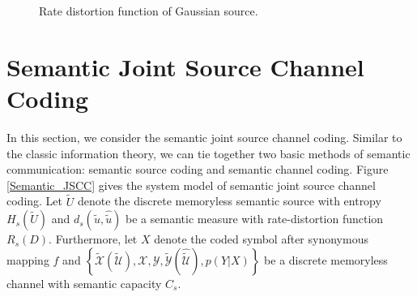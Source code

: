\documentclass[12pt, draftclsnofoot,onecolumn]{IEEEtran}
\begin{document}
\begin{figure}[htbp]
\setlength{\abovecaptionskip}{0.cm}
\setlength{\belowcaptionskip}{-0.cm}
  \caption{Rate distortion function of Gaussian source.}\label{rate_distortion_comp}
\end{figure}

\section{Semantic Joint Source Channel Coding}
\label{section_X}
In this section, we consider the semantic joint source channel coding. Similar to the classic information theory, we can tie together two basic methods of semantic communication: semantic source coding and semantic channel coding. Figure \ref{Semantic_JSCC} gives the system model of semantic joint source channel coding. Let $\tilde{U}$ denote the discrete memoryless semantic source with entropy $H_s(\tilde{U})$ and $d_s(\tilde{u},\hat{\tilde{u}})$ be a semantic measure with rate-distortion function $R_s(D)$. Furthermore, let $X$ denote the coded symbol after synonymous mapping $f$ and $\left\{\tilde{\mathcal{X}}(\tilde{\mathcal{U}}),\mathcal{X},\mathcal{Y},\tilde{\mathcal{Y}}(\hat{\tilde{\mathcal{U}}}), p(Y|X)\right\}$ be a discrete memoryless channel with semantic capacity $C_s$.
\end{document}
